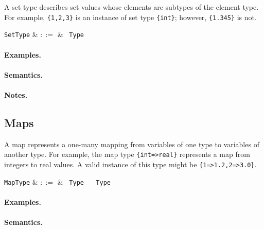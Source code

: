 A set type describes set values whose elements are subtypes of the element type. For example, \lstinline|{1,2,3}| is an instance of set type \lstinline|{int}|; however, \lstinline|{1.345}| is not.

\begin{syntax}
  \verb+SetType+ & $::=$ & \token{\{} \ \verb+Type+ \ \token{\}} \\
\end{syntax}

\paragraph{Examples.}

\paragraph{Semantics.}

\paragraph{Notes.} 


\subsection{Maps}

A map represents a one-many mapping from variables of one type to variables of another type. For example, the map type \lstinline|{int=>real}| represents a map from integers to real values. A valid instance of this type might be \lstinline|{1=>1.2,2=>3.0}|.

\begin{syntax}
  \verb+MapType+ & $::=$ & \token{\{} \ \verb+Type+ \ \token{=>} \ \verb+Type+ \ \token{\}} \\
\end{syntax}

\paragraph{Examples.}

\paragraph{Semantics.}

